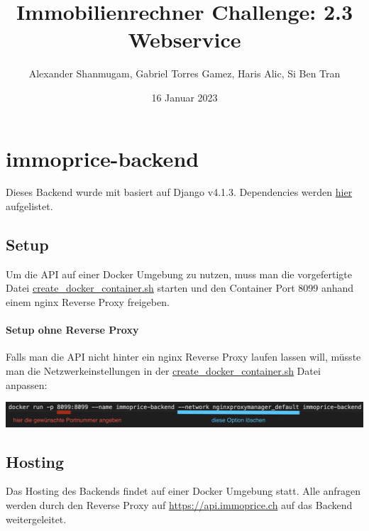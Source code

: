 \documentclass[a4paper, 12pt]{article}
\title{Immobilienrechner Challenge: 2.3 Webservice}
\author{Alexander Shanmugam, Gabriel Torres Gamez, Haris Alic, Si Ben Tran}
\date{16 Januar 2023}
\begin{document}
\maketitle
\newpage

\hypertarget{immoprice-backend}{%
\section{immoprice-backend}\label{immoprice-backend}}

Dieses Backend wurde mit basiert auf Django v4.1.3. Dependencies werden
\href{https://github.com/Immobilienrechner-Challenge/immoprice-backend/blob/main/requirements.txt}{hier}
aufgelistet.

\hypertarget{setup}{%
\subsection{Setup}\label{setup}}

Um die API auf einer Docker Umgebung zu nutzen, muss man die
vorgefertigte Datei
\href{https://github.com/Immobilienrechner-Challenge/immoprice-backend/blob/main/create_docker_container.sh}{create\_docker\_container.sh}
starten und den Container Port 8099 anhand einem nginx Reverse Proxy
freigeben.

\hypertarget{setup-ohne-reverse-proxy}{%
\paragraph{Setup ohne Reverse Proxy}\label{setup-ohne-reverse-proxy}}

Falls man die API nicht hinter ein nginx Reverse Proxy laufen lassen
will, müsste man die Netzwerkeinstellungen in der
\href{https://github.com/Immobilienrechner-Challenge/immoprice-backend/blob/main/create_docker_container.sh}{create\_docker\_container.sh}
Datei anpassen:

\includegraphics[width=\linewidth]{img/EinstellungDocker.png}

\newpage
\hypertarget{hosting}{%
\subsection{Hosting}\label{hosting}}

Das Hosting des Backends findet auf einer Docker Umgebung statt. Alle
anfragen werden durch den Reverse Proxy auf
\href{https://api.immoprice.ch}{https://api.immoprice.ch} auf das
Backend weitergeleitet.
\end{document}
